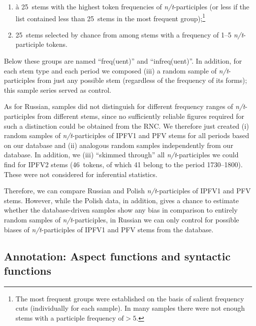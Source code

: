 \documentclass[output=paper]{langscibook}
\begin{document}
\begin{enumerate}[label=(\roman*)]
    \item à 25~stems with the highest token frequencies of \textit{n/t}-participles (or less if the list contained less than 25~stems in the most frequent group);\footnote{The most frequent groups were established on the basis of salient frequency cuts (individually for each sample). In many samples there were not enough stems with a participle $\text{frequency of}>5$.}
    \item 25~stems selected by chance from among stems with a frequency of 1--5 \textit{n/t}-participle tokens. 
\end{enumerate}

\noindent Below these groups are named ``freq(uent)'' and ``infreq(uent)''. In addition, for each stem type and each period we composed (iii) a random sample of \textit{n/t}-participles from just any possible stem (regardless of the frequency of its forms); this sample series served as control. 

As for Russian, samples did not distinguish for different frequency ranges of \textit{n/t}-participles from different stems, since no sufficiently reliable figures required for such a distinction could be obtained from the RNC. We therefore just created (i) random samples of \textit{n/t}-participles of IPFV1 and PFV stems for all periods based on our database and (ii) analogous random samples independently from our database. In addition, we (iii) “skimmed through” all \textit{n/t}-participles we could find for IPFV2 stems (46~tokens, of which 41 belong to the period 1730--1800). These were not considered for inferential statistics.

Therefore, we can compare Russian and Polish \textit{n/t}-participles of IPFV1 and PFV stems. However, while the Polish data, in addition, gives a chance to estimate whether the database-driven samples show any bias in comparison to entirely random samples of \textit{n/t}-participles, in Russian we can only control for possible biases of \textit{n/t}-participles of IPFV1 and PFV stems from the database.\largerpage[-2]

\subsection{Annotation: Aspect functions and syntactic functions}\label{wiem:sec:annotation}
\end{document}
